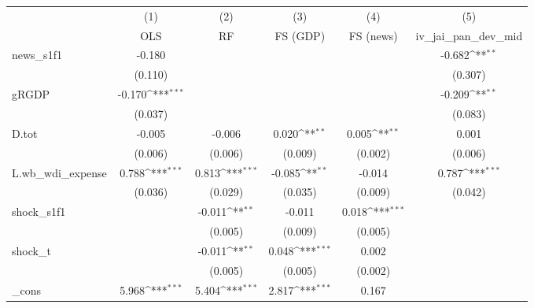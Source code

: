 {
\def\sym#1{\ifmmode^{#1}\else\(^{#1}\)\fi}
\begin{tabular}{l*{5}{c}}
\toprule
            &\multicolumn{1}{c}{(1)}&\multicolumn{1}{c}{(2)}&\multicolumn{1}{c}{(3)}&\multicolumn{1}{c}{(4)}&\multicolumn{1}{c}{(5)}\\
            &\multicolumn{1}{c}{OLS}&\multicolumn{1}{c}{RF}&\multicolumn{1}{c}{FS (GDP)}&\multicolumn{1}{c}{FS (news)}&\multicolumn{1}{c}{iv\_jai\_pan\_dev\_mid}\\
\midrule
news\_s1f1   &      -0.180         &                     &                     &                     &      -0.682\sym{**} \\
            &     (0.110)         &                     &                     &                     &     (0.307)         \\
\addlinespace
gRGDP       &      -0.170\sym{***}&                     &                     &                     &      -0.209\sym{**} \\
            &     (0.037)         &                     &                     &                     &     (0.083)         \\
\addlinespace
D.tot       &      -0.005         &      -0.006         &       0.020\sym{**} &       0.005\sym{**} &       0.001         \\
            &     (0.006)         &     (0.006)         &     (0.009)         &     (0.002)         &     (0.006)         \\
\addlinespace
L.wb\_wdi\_expense&       0.788\sym{***}&       0.813\sym{***}&      -0.085\sym{**} &      -0.014         &       0.787\sym{***}\\
            &     (0.036)         &     (0.029)         &     (0.035)         &     (0.009)         &     (0.042)         \\
\addlinespace
shock\_s1f1  &                     &      -0.011\sym{**} &      -0.011         &       0.018\sym{***}&                     \\
            &                     &     (0.005)         &     (0.009)         &     (0.005)         &                     \\
\addlinespace
shock\_t     &                     &      -0.011\sym{**} &       0.048\sym{***}&       0.002         &                     \\
            &                     &     (0.005)         &     (0.005)         &     (0.002)         &                     \\
\addlinespace
\_cons      &       5.968\sym{***}&       5.404\sym{***}&       2.817\sym{***}&       0.167         &                     \\

\end{tabular}}
